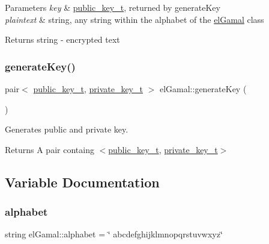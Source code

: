 \begin{DoxyParams}{Parameters}
{\em key} & \mbox{\hyperlink{structelGamal_1_1public__key__t}{public\+\_\+key\+\_\+t}}, returned by generate\+Key \\
\hline
{\em plaintext} & string, any string within the alphabet of the \mbox{\hyperlink{namespaceelGamal}{el\+Gamal}} class\\
\hline
\end{DoxyParams}
\begin{DoxyReturn}{Returns}
string -\/ encrypted text 
\end{DoxyReturn}
\mbox{\label{namespaceelGamal_a146d7e0430b165ea18111d6342b7888b}} 
\subsubsection{\texorpdfstring{generate\+Key()}{generateKey()}}
{\footnotesize\ttfamily pair$<$ \mbox{\hyperlink{structelGamal_1_1public__key__t}{public\+\_\+key\+\_\+t}}, \mbox{\hyperlink{structelGamal_1_1private__key__t}{private\+\_\+key\+\_\+t}} $>$ el\+Gamal\+::generate\+Key (\begin{DoxyParamCaption}{ }\end{DoxyParamCaption})}



Generates public and private key. 

\begin{DoxyReturn}{Returns}
A pair containg $<$\mbox{\hyperlink{structelGamal_1_1public__key__t}{public\+\_\+key\+\_\+t}}, \mbox{\hyperlink{structelGamal_1_1private__key__t}{private\+\_\+key\+\_\+t}}$>$ 
\end{DoxyReturn}


\subsection{Variable Documentation}
\mbox{\label{namespaceelGamal_af54bb3d0000ef0479ad0d9f9ad7b1a6a}} 
\subsubsection{\texorpdfstring{alphabet}{alphabet}}
{\footnotesize\ttfamily string el\+Gamal\+::alphabet = \char`\"{} abcdefghijklmnopqrstuvwxyz\char`\"{}\hspace{0.3cm}{\ttfamily [static]}}



